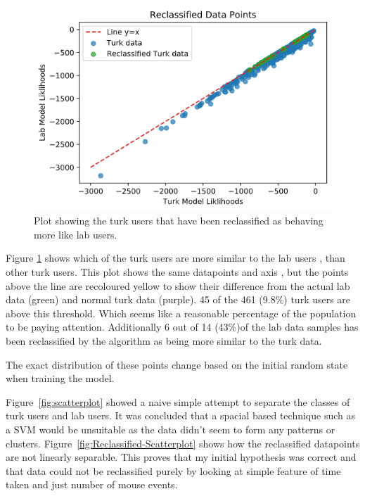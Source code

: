 \documentclass{article}
\begin{document}
\begin{figure}[ht!]
    \centering
    \includegraphics[scale=0.5]{Images/Reclassified-Data.png}
    \caption{Plot showing the turk users that have been reclassified as behaving more like lab users. }
    \label{fig:Reclassified}
\end{figure}

Figure \ref{fig:Reclassified} shows which of the turk users are more similar to the lab users
, than other turk users. 
This plot shows the same datapoints and axis
, but the points above the line are recoloured yellow to show their difference from the actual lab data (green) and normal turk data (purple). 
45 of the 461 (9.8\%) turk users are above this threshold. 
Which seems like a reasonable percentage of the population to be paying attention. 
Additionally 6 out of 14 (43\%)of the lab data samples has been reclassified by the algorithm as being more similar to the turk data.

The exact distribution of these points change based on the initial random state when training the model.

Figure~\ref{fig:scatterplot} showed a naive simple attempt to separate the classes of turk users and lab users.
It was concluded that a spacial based technique such as a SVM would be unsuitable as the data didn't seem to form any patterns or clusters.
Figure~\ref{fig:Reclassified-Scatterplot} shows how the reclassified datapoints are not linearly separable.
This proves that my initial hypothesis was correct and that data could not be reclassified purely by looking at simple feature of time taken and just number of mouse events.
\end{document}
